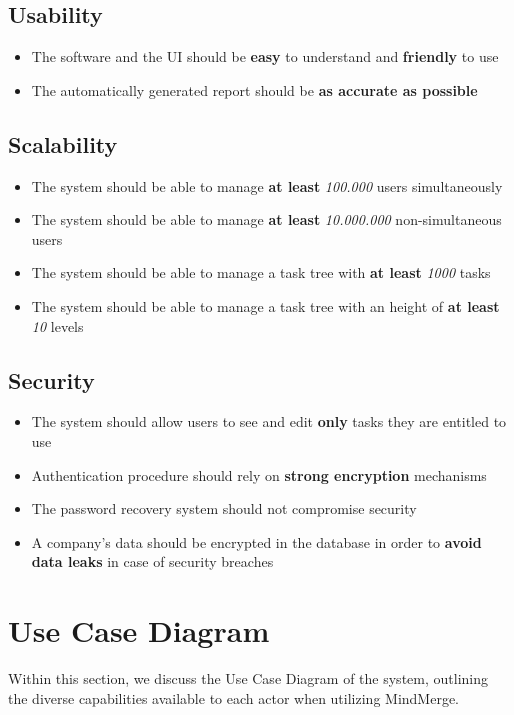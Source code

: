 \documentclass{article}
\begin{document}
\subsection{Usability}
\begin{itemize}
    \item The software and the UI should be \textbf{easy} to understand and \textbf{friendly} to use
    \item The automatically generated report should be \textbf{as accurate as possible}
\end{itemize}

\subsection{Scalability}
\begin{itemize}
    \item The system should be able to manage \textbf{at least} \textit{100.000} users simultaneously
    \item The system should be able to manage \textbf{at least} \textit{10.000.000} non-simultaneous users
    \item The system should be able to manage a task tree with \textbf{at least} \textit{1000} tasks
    \item The system should be able to manage a task tree with an height of \textbf{at least} \textit{10} levels
\end{itemize}

\subsection{Security}
\begin{itemize}
    \item The system should allow users to see and edit \textbf{only} tasks they are entitled to use
    \item Authentication procedure should rely on \textbf{strong encryption} mechanisms
    \item The password recovery system should not compromise security
    \item A company's data should be encrypted in the database in order to \textbf{avoid data leaks} in case of security breaches
\end{itemize}
\pagebreak

\section{Use Case Diagram}
Within this section, we discuss the Use Case Diagram of the system, outlining the diverse capabilities available to each actor when utilizing MindMerge.
\end{document}
